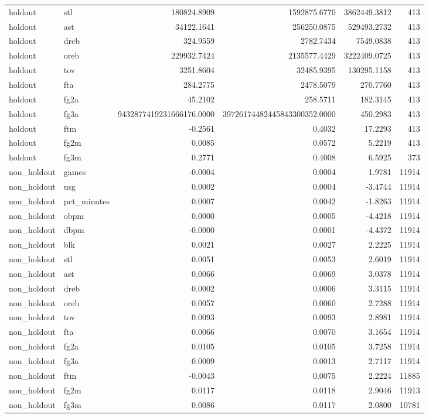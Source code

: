 \begin{table}
\begin{tabular}{llrrrr}
holdout & stl & 180824.8909 & 1592875.6770 & 3862449.3812 & 413 \\
holdout & ast & 34122.1641 & 256250.0875 & 529493.2732 & 413 \\
holdout & dreb & 324.9559 & 2782.7434 & 7549.0838 & 413 \\
holdout & oreb & 229932.7424 & 2135577.4429 & 3222409.0725 & 413 \\
holdout & tov & 3251.8604 & 32485.9395 & 130295.1158 & 413 \\
holdout & fta & 284.2775 & 2478.5079 & 270.7760 & 413 \\
holdout & fg2a & 45.2102 & 258.5711 & 182.3145 & 413 \\
holdout & fg3a & 9432877419231666176.0000 & 39726174482445843300352.0000 & 450.2983 & 413 \\
holdout & ftm & -0.2561 & 0.4032 & 17.2293 & 413 \\
holdout & fg2m & 0.0085 & 0.0572 & 5.2219 & 413 \\
holdout & fg3m & 0.2771 & 0.4008 & 6.5925 & 373 \\
non\_holdout & games & -0.0004 & 0.0004 & 1.9781 & 11914 \\
non\_holdout & usg & 0.0002 & 0.0004 & -3.4744 & 11914 \\
non\_holdout & pct\_minutes & 0.0007 & 0.0042 & -1.8263 & 11914 \\
non\_holdout & obpm & 0.0000 & 0.0005 & -4.4218 & 11914 \\
non\_holdout & dbpm & -0.0000 & 0.0001 & -4.4372 & 11914 \\
non\_holdout & blk & 0.0021 & 0.0027 & 2.2225 & 11914 \\
non\_holdout & stl & 0.0051 & 0.0053 & 2.6019 & 11914 \\
non\_holdout & ast & 0.0066 & 0.0069 & 3.0378 & 11914 \\
non\_holdout & dreb & 0.0002 & 0.0006 & 3.3115 & 11914 \\
non\_holdout & oreb & 0.0057 & 0.0060 & 2.7288 & 11914 \\
non\_holdout & tov & 0.0093 & 0.0093 & 2.8981 & 11914 \\
non\_holdout & fta & 0.0066 & 0.0070 & 3.1654 & 11914 \\
non\_holdout & fg2a & 0.0105 & 0.0105 & 3.7258 & 11914 \\
non\_holdout & fg3a & 0.0009 & 0.0013 & 2.7117 & 11914 \\
non\_holdout & ftm & -0.0043 & 0.0075 & 2.2224 & 11885 \\
non\_holdout & fg2m & 0.0117 & 0.0118 & 2.9046 & 11913 \\
non\_holdout & fg3m & 0.0086 & 0.0117 & 2.0800 & 10781 \\
\bottomrule
\end{tabular}
\end{table}
